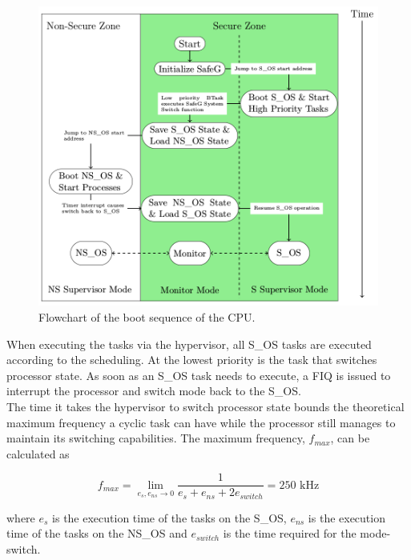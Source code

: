 \begin{figure}[H]
\centering
\includegraphics[width=\textwidth]{./img/literature_modeswitch.png}
\caption{Flowchart of the boot sequence of the CPU. \cite{zaki2016}}\label{fig:modeswitch}
\end{figure}

When executing the tasks via the hypervisor, all S\_OS tasks are executed according to the scheduling. At the lowest priority is the task that switches processor state. As soon as an S\_OS task needs to execute, a FIQ is issued to interrupt the processor and switch mode back to the S\_OS. \\

The time it takes the hypervisor to switch processor state bounds the theoretical maximum frequency a cyclic task can have while the processor still manages to maintain its switching capabilities. The maximum frequency, $f_{max}$, can be calculated as

$$f_{max} = \lim_{e_s, e_{ns} \to 0} \frac{1}{e_s+e_{ns}+2e_{switch}} = 250\textrm{ kHz}$$

where $e_s$ is the execution time of the tasks on the S\_OS, $e_{ns}$ is the execution time of the tasks on the NS\_OS and $e_{switch}$ is the time required for the mode-switch.\\


